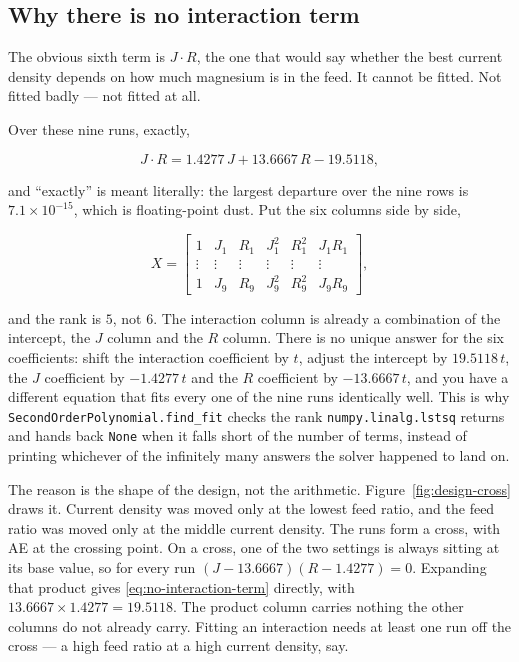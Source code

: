 \subsection{Why there is no interaction term}

The obvious sixth term is $J\!\cdot\!R$, the one that would say whether the best current density
depends on how much magnesium is in the feed. It cannot be fitted. Not fitted badly --- not
fitted at all.

Over these nine runs, exactly,

\begin{equation}
  \label{eq:no-interaction-term}
  J\!\cdot\!R = 1.4277\,J + 13.6667\,R - 19.5118,
\end{equation}

and ``exactly'' is meant literally: the largest departure over the nine rows is
$7.1\times10^{-15}$, which is floating-point dust. Put the six columns side by side,

\begin{equation}
  X = \begin{bmatrix}
    1 & J_1 & R_1 & J_1^2 & R_1^2 & J_1 R_1 \\
    \vdots & \vdots & \vdots & \vdots & \vdots & \vdots \\
    1 & J_9 & R_9 & J_9^2 & R_9^2 & J_9 R_9
  \end{bmatrix},
\end{equation}

and the rank is $5$, not $6$. The interaction column is already a combination of the intercept,
the $J$ column and the $R$ column. There is no unique answer for the six coefficients: shift the
interaction coefficient by $t$, adjust the intercept by $19.5118\,t$, the $J$ coefficient by
$-1.4277\,t$ and the $R$ coefficient by $-13.6667\,t$, and you have a different equation that
fits every one of the nine runs identically well. This is why
\texttt{SecondOrderPolynomial\allowbreak{}.find\_fit} checks the rank \texttt{numpy.linalg.lstsq}
returns and hands back \texttt{None} when it falls short of the number of terms, instead of
printing whichever of the infinitely many answers the solver happened to land on.

The reason is the shape of the design, not the arithmetic. Figure~\ref{fig:design-cross} draws
it. Current density was moved only at the lowest feed ratio, and the feed ratio was moved only at
the middle current density. The runs form a cross, with AE at the crossing point. On a cross,
one of the two settings is always sitting at its base value, so for every run
$(J - 13.6667)(R - 1.4277) = 0$. Expanding that product gives
\eqref{eq:no-interaction-term} directly, with $13.6667 \times 1.4277 = 19.5118$. The product
column carries nothing the other columns do not already carry. Fitting an interaction needs at
least one run off the cross --- a high feed ratio at a high current density, say.

